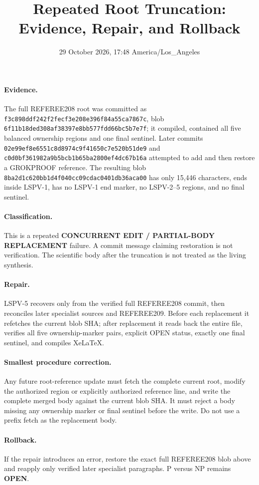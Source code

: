 \documentclass[11pt]{article}
\title{Repeated Root Truncation: Evidence, Repair, and Rollback}
\date{29 October 2026, 17:48 America/Los\_Angeles}
\begin{document}
\maketitle

\paragraph{Evidence.}
The full REFEREE208 root was committed as
\texttt{f3c898ddf242f2fecf3e208e396f84a55ca7867c}, blob
\texttt{6f11b18ded308af38397e8bb577fdd66bc5b7e7f}; it compiled, contained all five
balanced ownership regions and one final sentinel.  Later commits
\texttt{02e99ef8e6551c8d8974c9f41650c7e520b51de9} and
\texttt{c0d0bf361982a9b5bcb1b65ba2800ef4dc67b16a} attempted to add and then restore a
GROKPROOF reference.  The resulting blob
\texttt{8ba2d1c620bb1d4f040cc09cdac0401db36aca00} has only 15,446 characters,
ends inside LSPV-1, has no LSPV-1 end marker, no LSPV-2--5 regions, and no final sentinel.

\paragraph{Classification.}
This is a repeated \textbf{CONCURRENT EDIT / PARTIAL-BODY REPLACEMENT} failure.  A commit message
claiming restoration is not verification.  The scientific body after the truncation is not treated as
the living synthesis.

\paragraph{Repair.}
LSPV-5 recovers only from the verified full REFEREE208 commit, then reconciles later specialist
sources and REFEREE209.  Before each replacement it refetches the current blob SHA; after replacement
it reads back the entire file, verifies all five ownership-marker pairs, explicit OPEN status, exactly
one final sentinel, and compiles XeLaTeX.

\paragraph{Smallest procedure correction.}
Any future root-reference update must fetch the complete current root, modify the authorized region or
explicitly authorized reference line, and write the complete merged body against the current blob SHA.
It must reject a body missing any ownership marker or final sentinel before the write.  Do not use a
prefix fetch as the replacement body.

\paragraph{Rollback.}
If the repair introduces an error, restore the exact full REFEREE208 blob above and reapply only
verified later specialist paragraphs.  P versus NP remains \textbf{OPEN}.

\end{document}
